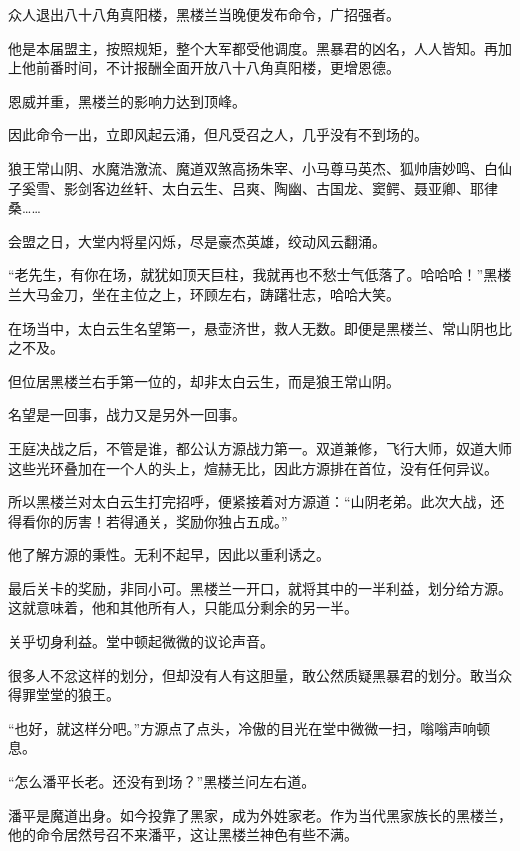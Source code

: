
\begin{this_body}

众人退出八十八角真阳楼，黑楼兰当晚便发布命令，广招强者。

他是本届盟主，按照规矩，整个大军都受他调度。黑暴君的凶名，人人皆知。再加上他前番时间，不计报酬全面开放八十八角真阳楼，更增恩德。

恩威并重，黑楼兰的影响力达到顶峰。

因此命令一出，立即风起云涌，但凡受召之人，几乎没有不到场的。

狼王常山阴、水魔浩激流、魔道双煞高扬朱宰、小马尊马英杰、狐帅唐妙鸣、白仙子奚雪、影剑客边丝轩、太白云生、吕爽、陶幽、古国龙、窦鳄、聂亚卿、耶律桑……

会盟之日，大堂内将星闪烁，尽是豪杰英雄，绞动风云翻涌。

“老先生，有你在场，就犹如顶天巨柱，我就再也不愁士气低落了。哈哈哈！”黑楼兰大马金刀，坐在主位之上，环顾左右，踌躇壮志，哈哈大笑。

在场当中，太白云生名望第一，悬壶济世，救人无数。即便是黑楼兰、常山阴也比之不及。

但位居黑楼兰右手第一位的，却非太白云生，而是狼王常山阴。

名望是一回事，战力又是另外一回事。

王庭决战之后，不管是谁，都公认方源战力第一。双道兼修，飞行大师，奴道大师这些光环叠加在一个人的头上，煊赫无比，因此方源排在首位，没有任何异议。

所以黑楼兰对太白云生打完招呼，便紧接着对方源道：“山阴老弟。此次大战，还得看你的厉害！若得通关，奖励你独占五成。”

他了解方源的秉性。无利不起早，因此以重利诱之。

最后关卡的奖励，非同小可。黑楼兰一开口，就将其中的一半利益，划分给方源。这就意味着，他和其他所有人，只能瓜分剩余的另一半。

关乎切身利益。堂中顿起微微的议论声音。

很多人不忿这样的划分，但却没有人有这胆量，敢公然质疑黑暴君的划分。敢当众得罪堂堂的狼王。

“也好，就这样分吧。”方源点了点头，冷傲的目光在堂中微微一扫，嗡嗡声响顿息。

“怎么潘平长老。还没有到场？”黑楼兰问左右道。

潘平是魔道出身。如今投靠了黑家，成为外姓家老。作为当代黑家族长的黑楼兰，他的命令居然号召不来潘平，这让黑楼兰神色有些不满。


\end{this_body}
